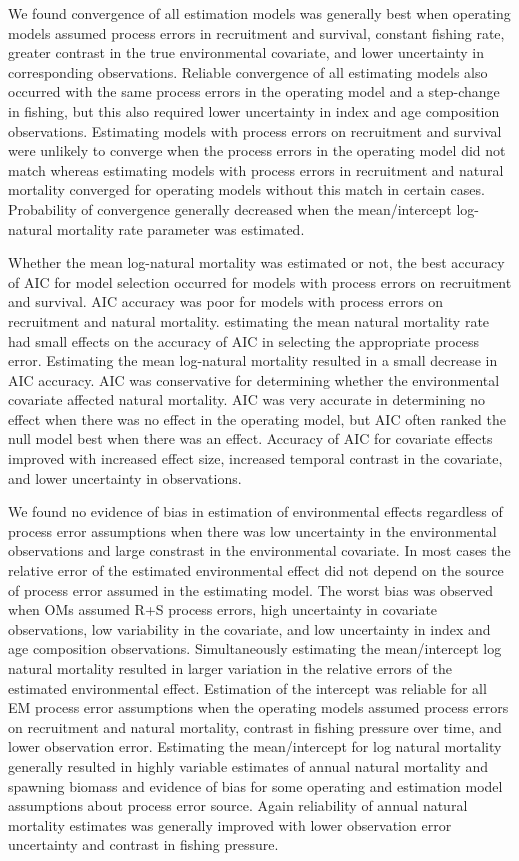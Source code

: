 \documentclass[
  12pt,
]{article}
\begin{document}
We found convergence of all estimation models was generally best when operating models assumed process errors in recruitment and survival, constant fishing rate, greater contrast in the true environmental covariate, and lower uncertainty in corresponding observations. Reliable convergence of all estimating models also occurred with the same process errors in the operating model and a step-change in fishing, but this also required lower uncertainty in index and age composition observations. Estimating models with process errors on recruitment and survival were unlikely to converge when the process errors in the operating model did not match whereas estimating models with process errors in recruitment and natural mortality converged for operating models without this match in certain cases. Probability of convergence generally decreased when the mean/intercept log-natural mortality rate parameter was estimated.

Whether the mean log-natural mortality was estimated or not, the best accuracy of AIC for model selection occurred for models with process errors on recruitment and survival. AIC accuracy was poor for models with process errors on recruitment and natural mortality. estimating the mean natural mortality rate had small effects on the accuracy of AIC in selecting the appropriate process error. Estimating the mean log-natural mortality resulted in a small decrease in AIC accuracy. AIC was conservative for determining whether the environmental covariate affected natural mortality. AIC was very accurate in determining no effect when there was no effect in the operating model, but AIC often ranked the null model best when there was an effect. Accuracy of AIC for covariate effects improved with increased effect size, increased temporal contrast in the covariate, and lower uncertainty in observations.

We found no evidence of bias in estimation of environmental effects regardless of process error assumptions when there was low uncertainty in the environmental observations and large constrast in the environmental covariate. In most cases the relative error of the estimated environmental effect did not depend on the source of process error assumed in the estimating model. The worst bias was observed when OMs assumed R+S process errors, high uncertainty in covariate observations, low variability in the covariate, and low uncertainty in index and age composition observations. Simultaneously estimating the mean/intercept log natural mortality resulted in larger variation in the relative errors of the estimated environmental effect. Estimation of the intercept was reliable for all EM process error assumptions when the operating models assumed process errors on recruitment and natural mortality, contrast in fishing pressure over time, and lower observation error. Estimating the mean/intercept for log natural mortality generally resulted in highly variable estimates of annual natural mortality and spawning biomass and evidence of bias for some operating and estimation model assumptions about process error source. Again reliability of annual natural mortality estimates was generally improved with lower observation error uncertainty and contrast in fishing pressure.
\end{document}
